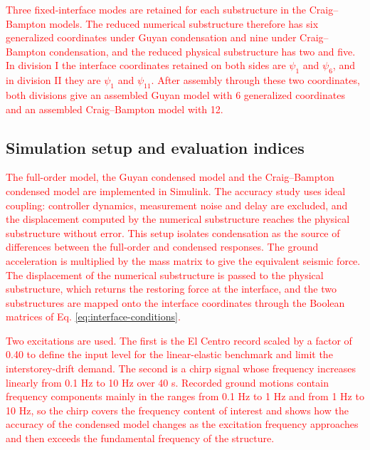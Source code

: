 \documentclass[11pt,a4paper]{article}
\numberwithin{equation}{section}
\newcommand{\rev}[1]{\textcolor{red}{#1}}
\begin{document}
\rev{Three fixed-interface modes are retained for each substructure in the Craig--Bampton models. The reduced numerical substructure therefore has six generalized coordinates under Guyan condensation and nine under Craig--Bampton condensation, and the reduced physical substructure has two and five. In division I the interface coordinates retained on both sides are \(\psi_{1}\) and \(\psi_{6}\), and in division II they are \(\psi_{1}\) and \(\psi_{11}\). After assembly through these two coordinates, both divisions give an assembled Guyan model with 6 generalized coordinates and an assembled Craig--Bampton model with 12.}

\subsection{Simulation setup and evaluation indices}
\label{sec:setup}

\rev{The full-order model, the Guyan condensed model and the Craig--Bampton condensed model are implemented in Simulink. The accuracy study uses ideal coupling: controller dynamics, measurement noise and delay are excluded, and the displacement computed by the numerical substructure reaches the physical substructure without error. This setup isolates condensation as the source of differences between the full-order and condensed responses. The ground acceleration is multiplied by the mass matrix to give the equivalent seismic force. The displacement of the numerical substructure is passed to the physical substructure, which returns the restoring force at the interface, and the two substructures are mapped onto the interface coordinates through the Boolean matrices of Eq. \eqref{eq:interface-conditions}.}

\rev{Two excitations are used. The first is the El Centro record scaled by a factor of 0.40 to define the input level for the linear-elastic benchmark and limit the interstorey-drift demand. The second is a chirp signal whose frequency increases linearly from 0.1 Hz to 10 Hz over 40 s. Recorded ground motions contain frequency components mainly in the ranges from 0.1 Hz to 1 Hz and from 1 Hz to 10 Hz, so the chirp covers the frequency content of interest and shows how the accuracy of the condensed model changes as the excitation frequency approaches and then exceeds the fundamental frequency of the structure.}
\end{document}
